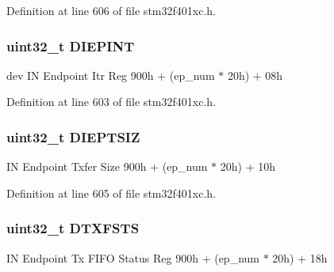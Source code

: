 Definition at line 606 of file stm32f401xc.\+h.

\subsubsection[{\texorpdfstring{D\+I\+E\+P\+I\+NT}{DIEPINT}}]{ uint32\+\_\+t D\+I\+E\+P\+I\+NT}\hypertarget{struct_u_s_b___o_t_g___i_n_endpoint_type_def_a65f69561c1cefe00ce608b7a3c2d8af5}{}\label{struct_u_s_b___o_t_g___i_n_endpoint_type_def_a65f69561c1cefe00ce608b7a3c2d8af5}
dev IN Endpoint Itr Reg 900h + (ep\+\_\+num $\ast$ 20h) + 08h 

Definition at line 603 of file stm32f401xc.\+h.

\subsubsection[{\texorpdfstring{D\+I\+E\+P\+T\+S\+IZ}{DIEPTSIZ}}]{ uint32\+\_\+t D\+I\+E\+P\+T\+S\+IZ}\hypertarget{struct_u_s_b___o_t_g___i_n_endpoint_type_def_a19cf1f1798a062c2a19afe9224e3f938}{}\label{struct_u_s_b___o_t_g___i_n_endpoint_type_def_a19cf1f1798a062c2a19afe9224e3f938}
IN Endpoint Txfer Size 900h + (ep\+\_\+num $\ast$ 20h) + 10h 

Definition at line 605 of file stm32f401xc.\+h.

\subsubsection[{\texorpdfstring{D\+T\+X\+F\+S\+TS}{DTXFSTS}}]{ uint32\+\_\+t D\+T\+X\+F\+S\+TS}\hypertarget{struct_u_s_b___o_t_g___i_n_endpoint_type_def_a44135a03aa87fb60abd479a09f71343d}{}\label{struct_u_s_b___o_t_g___i_n_endpoint_type_def_a44135a03aa87fb60abd479a09f71343d}
IN Endpoint Tx F\+I\+FO Status Reg 900h + (ep\+\_\+num $\ast$ 20h) + 18h 

